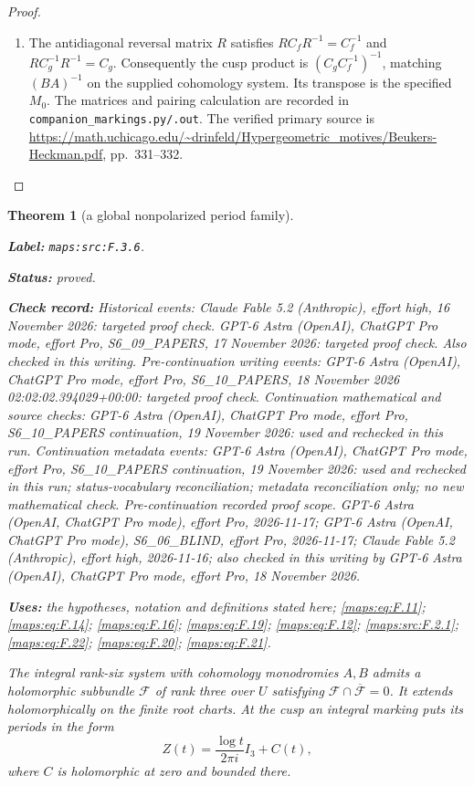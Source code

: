 \documentclass[11pt,a4paper]{article}
\newtheorem{theorem}{Theorem}[section]
\theoremstyle{definition}
\newcommand{\StatementRecord}[4]{\par\smallskip\begingroup\upshape\raggedright\noindent\textbf{Label:} \nolinkurl{#1}.\par\noindent\textbf{Status:} #2.\par\noindent\textbf{Check record:} #3.\par\noindent\textbf{Uses:} #4.\par\endgroup\smallskip}
\begin{document}
\begin{proof}
\begin{enumerate}[label=\arabic*.]
\item The antidiagonal reversal matrix $R$ satisfies
$RC_fR^{-1}=C_f^{-1}$ and $RC_g^{-1}R^{-1}=C_g$.
Consequently the cusp product is $(C_gC_f^{-1})^{-1}$, matching
$(BA)^{-1}$ on the supplied cohomology system.  Its transpose is the
specified $M_0$.  The matrices and pairing calculation are recorded in
\texttt{companion\_markings.py/.out}.  The verified primary source is
\url{https://math.uchicago.edu/~drinfeld/Hypergeometric_motives/Beukers-Heckman.pdf},
pp.~331--332.

\end{enumerate}
\end{proof}




\begin{theorem}[a global nonpolarized period family]\label{maps:src:F.3.6}
\StatementRecord{maps:src:F.3.6}{proved}{Historical events: Claude Fable 5.2 (Anthropic), effort high, 16 November 2026: targeted proof check. GPT-6 Astra (OpenAI), ChatGPT Pro mode, effort Pro, S6\_09\_PAPERS, 17 November 2026: targeted proof check. Also checked in this writing. Pre-continuation writing events: GPT-6 Astra (OpenAI), ChatGPT Pro mode, effort Pro, S6\_10\_PAPERS, 18 November 2026 02:02:02.394029+00:00: targeted proof check. Continuation mathematical and source checks: GPT-6 Astra (OpenAI), ChatGPT Pro mode, effort Pro, S6\_10\_PAPERS continuation, 19 November 2026: used and rechecked in this run. Continuation metadata events: GPT-6 Astra (OpenAI), ChatGPT Pro mode, effort Pro, S6\_10\_PAPERS continuation, 19 November 2026: used and rechecked in this run; status-vocabulary reconciliation; metadata reconciliation only; no new mathematical check. \emph{Pre-continuation recorded proof scope.} GPT-6 Astra (OpenAI, ChatGPT Pro mode), effort Pro, 2026-11-17; GPT-6 Astra (OpenAI, ChatGPT Pro mode), S6\_06\_BLIND, effort Pro, 2026-11-17; Claude Fable 5.2 (Anthropic), effort high, 2026-11-16; also checked in this writing by GPT-6 Astra (OpenAI), ChatGPT Pro mode, effort Pro, 18 November 2026}{the hypotheses, notation and definitions stated here; \cref{maps:eq:F.11}; \cref{maps:eq:F.14}; \cref{maps:eq:F.16}; \cref{maps:eq:F.19}; \cref{maps:eq:F.12}; \cref{maps:src:F.2.1}; \cref{maps:eq:F.22}; \cref{maps:eq:F.20}; \cref{maps:eq:F.21}}


The integral rank-six system with cohomology monodromies $A,B$
admits a holomorphic subbundle $\mathcal F$ of rank three over
$U$ satisfying $\mathcal F\cap\overline{\mathcal F}=0$.
It extends holomorphically on the finite root charts.  At the
cusp an integral marking puts its periods in the form
\[
 Z(t)=\frac{\log t}{2\pi i}I_3+C(t),
 \tag{F.13}\label{maps:eq:F.13}
\]
where $C$ is holomorphic at zero and bounded there.

\end{theorem}
\end{document}
